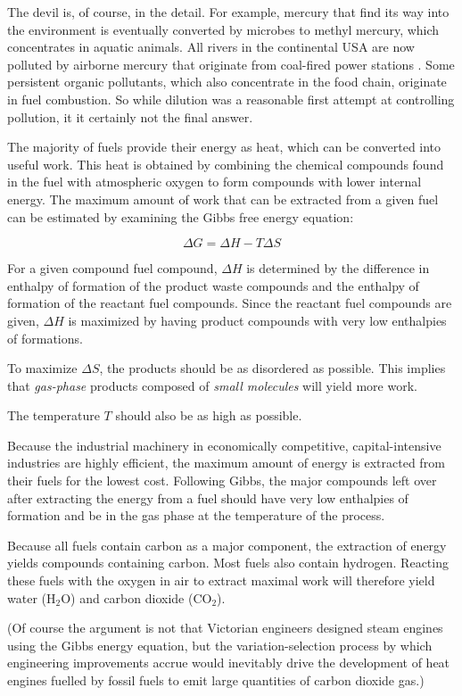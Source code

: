 The devil is, of course, in the detail. For example, mercury that find its way
into the environment is eventually converted by microbes to methyl mercury,
which concentrates in aquatic animals. All rivers in the continental USA are now
polluted by airborne mercury that originate from coal-fired power stations
\autocite{Wentz2014}. Some persistent organic pollutants, which also concentrate
in the food chain, originate in fuel combustion. So while dilution was a
reasonable first attempt at controlling pollution, it it certainly not the final
answer.

The majority of fuels provide their energy as heat, which can be converted into
useful work. This heat is obtained by combining the chemical compounds found in
the fuel with atmospheric oxygen to form compounds with lower internal energy. The
maximum amount of work that can be extracted from a given fuel can be estimated
by examining the Gibbs free energy equation:

\[
	\Delta G = \Delta H - T \Delta S
\]

For a given compound fuel compound, \(\Delta H\) is determined by the difference
in enthalpy of formation of the product waste compounds and the enthalpy of
formation of the reactant fuel compounds. Since the reactant fuel compounds are
given, \(\Delta H\) is maximized by having product compounds with very low
enthalpies of formations.

To maximize \(\Delta S\), the products should be as disordered as possible. This
implies that \emph{gas-phase} products composed of \emph{small molecules} will
yield more work.

The temperature \(T\) should also be as high as possible.

Because the industrial machinery in economically competitive, capital-intensive
industries are highly efficient, the maximum amount of energy is extracted from
their fuels for the lowest cost. Following Gibbs, the major compounds left over
after extracting the energy from a fuel should have very low enthalpies of
formation and be in the gas phase at the temperature of the process. 

Because all fuels contain carbon as a major component, the extraction of energy
yields compounds containing carbon. Most fuels also contain hydrogen. Reacting
these fuels with the oxygen in air to extract maximal work will therefore
yield water (H$_2$O) and carbon dioxide (CO$_2$). 

(Of course the argument is not that Victorian engineers designed steam engines
using the Gibbs energy equation, but the variation-selection process
\autocite[Chapter 8]{Vincenti1990} by which engineering improvements accrue would
inevitably drive the development of heat engines fuelled by fossil fuels to emit
large quantities of carbon dioxide gas.)

